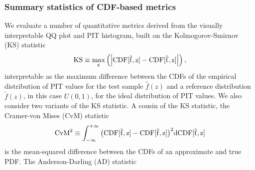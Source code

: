 \subsubsection{Summary statistics of CDF-based metrics}
We evaluate a number of quantitative metrics derived from the visually interpretable QQ plot and PIT histogram, built on the Kolmogorov-Smirnov (KS) statistic
\begin{equation}
\eqlabel{eq:ks}
\rm{KS} \equiv \max_{z} \left( \left| \rm{CDF}[\hat{f}, z] - \rm{CDF}[\tilde{f}, z] \right| \right),
\end{equation}
interpretable as the maximum difference between the CDFs of the empirical distribution of PIT values for the test sample $\hat{f}(z)$ and a reference distribution $\tilde{f}(z)$, in this case $U(0,1)$, for the ideal distribution of PIT values.
We also consider two variants of the KS statistic.
A cousin of the KS statistic, the Cramer-von Mises (CvM) statistic
\begin{equation}
\eqlabel{eq:cvm}
\rm{CvM}^{2} \equiv \int_{-\infty}^{+\infty} \big(\rm{CDF}[\hat{f}, z] - \rm{CDF}[\tilde{f}, z]\big)^2 \mathrm{d}\rm{CDF}[\tilde{f}, z]
\end{equation}
is the mean-squared difference between the CDFs of an approximate and true PDF.
The Anderson-Darling (AD) statistic
